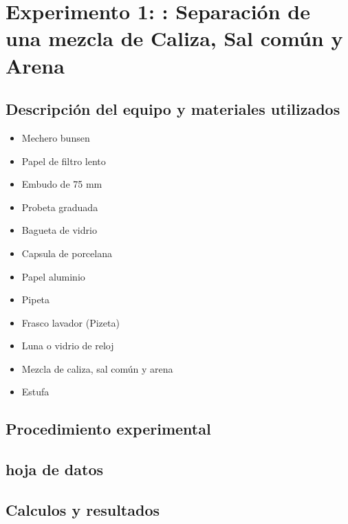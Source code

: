 \section{Experimento 1: : Separación de una mezcla de Caliza, Sal común y Arena }
\subsection{Descripción del equipo y materiales utilizados}
\begin{itemize}
    \item Mechero bunsen
    \item Papel de filtro lento
    \item Embudo de 75 mm                                     
    \item Probeta graduada
    \item Bagueta de vidrio                                         
    \item Capsula de porcelana  
    \item Papel aluminio                                              
    \item Pipeta
    \item Frasco lavador (Pizeta)                                
    \item Luna o vidrio de reloj
    \item Mezcla de caliza, sal común y arena            
    \item Estufa 
\end{itemize}

\subsection{Procedimiento experimental}
\subsection{hoja de datos}
\subsection{Calculos y resultados}
